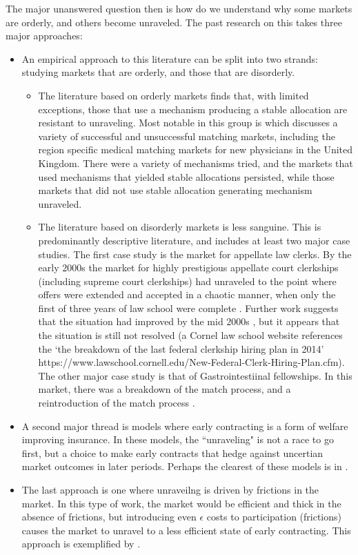 \documentclass[AER]{AEA}
\begin{document}
The major unanswered question then is how do we understand why some markets are orderly, and others become unraveled.  The past research on this takes three major approaches:

\begin{itemize}
	\item An empirical approach to this literature can be split into two strands: studying markets that are orderly, and those that are disorderly. 
	\begin{itemize}
		\item The literature based on orderly markets finds that, with limited exceptions, those that use a mechanism producing a stable allocation are resistant to unraveling.  Most notable in this group is  \cite{Roth2002} which discusses a variety of successful and unsuccessful matching markets, including the region specific medical matching markets for new physicians in the United Kingdom.  There were a variety of mechanisms tried, and the markets that used mechanisms that yielded stable allocations persisted, while those markets that did not use stable allocation generating mechanism unraveled.
		\item The literature based on disorderly markets is less sanguine. This is predominantly descriptive literature, and includes at least two major case studies. The first case study is the market for appellate law clerks.  By the early 2000s the market for highly prestigious appellate court clerkships (including supreme court clerkships) had unraveled to the point where offers were extended and accepted in a chaotic manner, when only the first of three years of law school were complete \cite{Avery2001}.  Further work suggests that the situation had improved by the mid 2000s \cite{Avery2007}, but it appears that the situation is still not resolved (a Cornel law school website references the `the breakdown of the last federal clerkship hiring plan in 2014' https://www.lawschool.cornell.edu/New-Federal-Clerk-Hiring-Plan.cfm). The other major case study is that of Gastrointestiinal fellowships.  In this market, there was a breakdown of the match process, and a reintroduction of the match process \cite{Niederle2008,Niederle2003}.  
	\end{itemize}
	 
	\item  A second major thread is models where early contracting is a form of welfare improving insurance. In these models, the ``unraveling" is not a race to go first, but a choice to make early contracts that hedge against uncertian market outcomes in later periods.  Perhaps the clearest of these models is in \cite{Li1998}.
	\item The last approach is one where unraveilng is driven by frictions in the market. In this type of work, the market would be efficient and thick in the absence of frictions, but introducing even $\epsilon$ costs to participation (frictions) causes the market to unravel to a less efficient state of early contracting.  This approach is exemplified by \cite{Damiano2005}.
\end{itemize}
\end{document}
